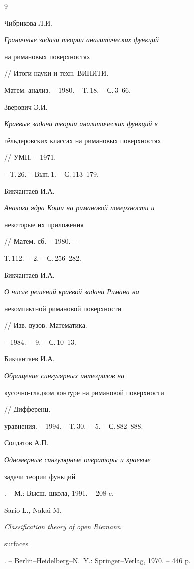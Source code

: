 \begin{thebibliography}{9}







Чибрикова Л.И. {\em Граничные задачи теории аналитических функций


на римановых поверхностях} // Итоги науки и техн. ВИНИТИ.


Матем. анализ. -- 1980. -- Т.\,18. -- С.\,3--66.




Зверович Э.И. {\em Краевые задачи теории аналитических функций в


г\"ельдеровских классах на римановых поверхностях } // УМН. -- 1971.


-- Т.\,26. -- Вып.\,1. -- С.\,113--179.




Бикчантаев И.А. {\em Аналоги ядра Коши на римановой поверхности и


некоторые их приложения} // Матем. сб. -- 1980. --


Т.\,112. -- \No\,2. -- С.\,256--282.




Бикчантаев И.А. {\em О числе решений краевой задачи Римана на


некомпактной римановой поверхности} // Изв. вузов. Математика.


-- 1984. -- \No\,9. -- С.\,10--13.




Бикчантаев И.А. {\em Обращение сингулярных интегралов на


кусочно-гладком контуре на римановой поверхности} // Дифференц.


уравнения. -- 1994. -- Т.\,30. -- \No\,5. -- С.\,882--888.




Солдатов А.П. {\em Одномерные сингулярные операторы и краевые


задачи теории функций}. -- М.: Высш. школа, 1991. -- 208 c.




Sario L., Nakai M. {\em Classification theory of open Riemann


surfaces}. -- Berlin--Heidelberg--N.~Y.: Springer--Verlag, 1970. -- 446 p.





\end{thebibliography}





\vskip 2cm














\label{end}






